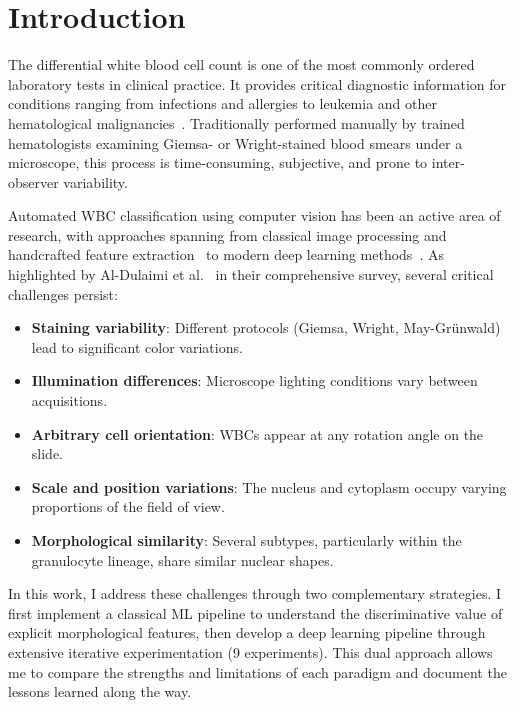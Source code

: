 \documentclass[twocolumn,a4paper]{article}
\begin{document}
\section{Introduction}

The differential white blood cell count is one of the most commonly ordered laboratory tests in clinical practice. It provides critical diagnostic information for conditions ranging from infections and allergies to leukemia and other hematological malignancies~\cite{aldulaimi2018}. Traditionally performed manually by trained hematologists examining Giemsa- or Wright-stained blood smears under a microscope, this process is time-consuming, subjective, and prone to inter-observer variability.

Automated WBC classification using computer vision has been an active area of research, with approaches spanning from classical image processing and handcrafted feature extraction~\cite{rezatofighi2011, gautam2014} to modern deep learning methods~\cite{qin2018, togacar2020}. As highlighted by Al-Dulaimi et al.~\cite{aldulaimi2018} in their comprehensive survey, several critical challenges persist:

\begin{itemize}
    \item \textbf{Staining variability}: Different protocols (Giemsa, Wright, May-Gr\"unwald) lead to significant color variations.
    \item \textbf{Illumination differences}: Microscope lighting conditions vary between acquisitions.
    \item \textbf{Arbitrary cell orientation}: WBCs appear at any rotation angle on the slide.
    \item \textbf{Scale and position variations}: The nucleus and cytoplasm occupy varying proportions of the field of view.
    \item \textbf{Morphological similarity}: Several subtypes, particularly within the granulocyte lineage, share similar nuclear shapes.
\end{itemize}

In this work, I address these challenges through two complementary strategies. I first implement a classical ML pipeline to understand the discriminative value of explicit morphological features, then develop a deep learning pipeline through extensive iterative experimentation (9 experiments). This dual approach allows me to compare the strengths and limitations of each paradigm and document the lessons learned along the way.
\end{document}
